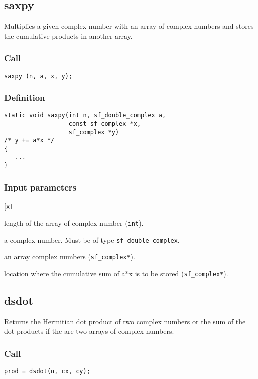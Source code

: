 \subsection{{saxpy}}
Multiplies a given complex number with an array of complex numbers and stores the cumulative products in another array.

\subsubsection*{Call}
\begin{verbatim}saxpy (n, a, x, y);\end{verbatim}

\subsubsection*{Definition}
\begin{verbatim}
static void saxpy(int n, sf_double_complex a, 
                  const sf_complex *x, 
                  sf_complex *y)
/* y += a*x */
{
   ...
}
\end{verbatim}

\subsubsection*{Input parameters}
\begin{desclist}{\tt }{\quad}[\tt x]
   \setlength\itemsep{0pt}
   \item[n] length of the array of complex number (\texttt{int}).  
   \item[a] a complex number. Must be of type \texttt{sf\_double\_complex}.  
   \item[x] an array complex numbers (\texttt{sf\_complex*}).  
   \item[y] location where the cumulative sum of a*x is to be stored (\texttt{sf\_complex*}).  
\end{desclist}





\subsection{{dsdot}}
Returns the Hermitian dot product of two complex numbers or the sum of the dot products if the are two arrays of complex numbers.

\subsubsection*{Call}
\begin{verbatim}prod = dsdot(n, cx, cy);\end{verbatim}

